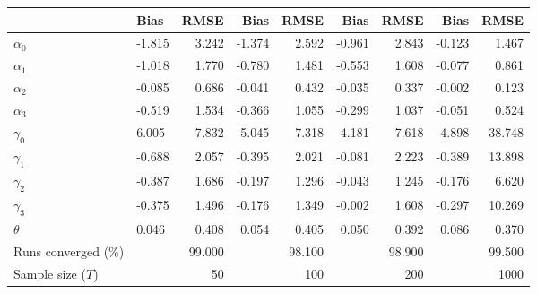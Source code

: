 
\begin{tabular}[t]{llrrrrrrr}
\toprule
  & Bias & RMSE & Bias & RMSE & Bias & RMSE & Bias & RMSE\\
\midrule
$\alpha_{0}$ & -1.815 & 3.242 & -1.374 & 2.592 & -0.961 & 2.843 & -0.123 & 1.467\\
$\alpha_{1}$ & -1.018 & 1.770 & -0.780 & 1.481 & -0.553 & 1.608 & -0.077 & 0.861\\
$\alpha_{2}$ & -0.085 & 0.686 & -0.041 & 0.432 & -0.035 & 0.337 & -0.002 & 0.123\\
$\alpha_{3}$ & -0.519 & 1.534 & -0.366 & 1.055 & -0.299 & 1.037 & -0.051 & 0.524\\
$\gamma_{0}$ & 6.005 & 7.832 & 5.045 & 7.318 & 4.181 & 7.618 & 4.898 & 38.748\\
$\gamma_{1}$ & -0.688 & 2.057 & -0.395 & 2.021 & -0.081 & 2.223 & -0.389 & 13.898\\
$\gamma_{2}$ & -0.387 & 1.686 & -0.197 & 1.296 & -0.043 & 1.245 & -0.176 & 6.620\\
$\gamma_{3}$ & -0.375 & 1.496 & -0.176 & 1.349 & -0.002 & 1.608 & -0.297 & 10.269\\
$\theta$ & 0.046 & 0.408 & 0.054 & 0.405 & 0.050 & 0.392 & 0.086 & 0.370\\
Runs converged (\%) &  & 99.000 &  & 98.100 &  & 98.900 &  & 99.500\\
Sample size ($T$) &  & 50 &  & 100 &  & 200 &  & 1000\\
\bottomrule
\end{tabular}

